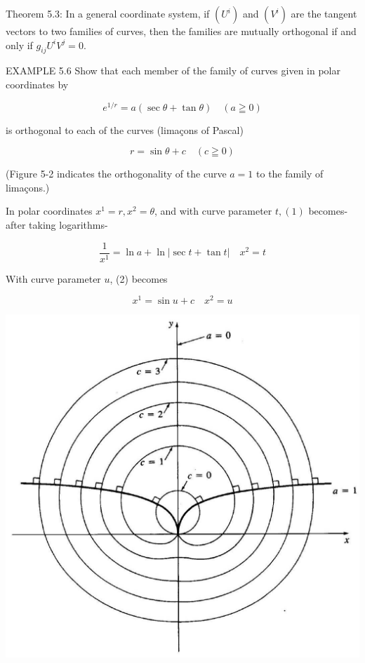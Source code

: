 \documentclass[10pt]{article}
\begin{document}
Theorem 5.3: In a general coordinate system, if $\left(U^{i}\right)$ and $\left(V^{i}\right)$ are the tangent vectors to two families of curves, then the families are mutually orthogonal if and only if $g_{i j} U^{i} V^{j}=0$.

EXAMPLE 5.6 Show that each member of the family of curves given in polar coordinates by


\begin{equation*}
e^{1 / r}=a(\sec \theta+\tan \theta) \quad(a \geqq 0) \tag{1}
\end{equation*}


is orthogonal to each of the curves (limaçons of Pascal)


\begin{equation*}
r=\sin \theta+c \quad(c \geqq 0) \tag{2}
\end{equation*}


(Figure 5-2 indicates the orthogonality of the curve $a=1$ to the family of limaçons.)

In polar coordinates $x^{1}=r, x^{2}=\theta$, and with curve parameter $t,(1)$ becomes-after taking logarithms-

$$
\frac{1}{x^{1}}=\ln a+\ln |\sec t+\tan t| \quad x^{2}=t
$$

With curve parameter $u$, (2) becomes

$$
x^{1}=\sin u+c \quad x^{2}=u
$$

\begin{center}
\includegraphics[max width=\textwidth]{2024_04_03_41f90be4f896e21f0dc9g-066}
\end{center}
\end{document}
